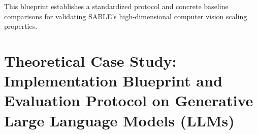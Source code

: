 \documentclass{article}
\theoremstyle{plain}
\theoremstyle{definition}
\theoremstyle{remark}
\begin{document}
\begin{table}[htbp]
\caption{\textbf{Extrapolated Target Specifications}: Qualitative Theoretical Comparison and Design Roadmap of SABLE vs. Standard Weight-Space Merging and Systems-level Pipelines on high-dimensional Vision Transformer (ViT-B/16) backbones under Heterogeneous Streaming ($B=32$). Accuracy and Latency columns represent conceptual trends and architectural behaviors based on SABLE's mathematical ensembling equivalence, rather than empirical measurements.}
\label{tab:vit_projections}
\vskip 0.15in
\begin{center}
\begin{small}
\begin{sc}
\end{sc}
\end{small}
\end{center}
\end{table}

This blueprint establishes a standardized protocol and concrete baseline comparisons for validating SABLE's high-dimensional computer vision scaling properties.

\newpage
\section{Theoretical Case Study: Implementation Blueprint and Evaluation Protocol on Generative Large Language Models (LLMs)}
\label{app:llm_blueprint}
\end{document}
